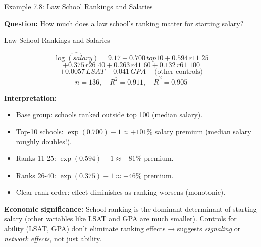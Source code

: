 \documentclass[aspectratio=169, 12pt]{beamer}
\begin{document}
\begin{frame}[shrink=28]{Example 7.8: Law School Rankings and Salaries}

  \textbf{Question:} How much does a law school's ranking matter for starting salary?

  \medskip

  \begin{examplebox}{Law School Rankings and Salaries}
    \begin{small}
    \[
      \widehat{\log(\textit{salary})} = 9.17 + 0.700 \, \textit{top10} + 0.594 \, \textit{r11\_25}
    \]
    \[
      + 0.375 \, \textit{r26\_40} + 0.263 \, \textit{r41\_60} + 0.132 \, \textit{r61\_100}
    \]
    \[
      + 0.0057 \, \textit{LSAT} + 0.041 \, \textit{GPA} + \text{(other controls)}
    \]
    \[
      n = 136, \quad R^2 = 0.911, \quad \bar{R}^2 = 0.905
    \]
    \end{small}
  \end{examplebox}

  \medskip

  \textbf{Interpretation:}

  \begin{keybox}
    \begin{itemize}
      \item Base group: schools ranked outside top 100 (median salary).
      \item Top-10 schools: $\exp(0.700) - 1 \approx +101\%$ salary premium (median salary roughly doubles!).
      \item Ranks 11-25: $\exp(0.594) - 1 \approx +81\%$ premium.
      \item Ranks 26-40: $\exp(0.375) - 1 \approx +46\%$ premium.
      \item Clear rank order: effect diminishes as ranking worsens (monotonic).
    \end{itemize}
  \end{keybox}

  \medskip

  \begin{highlightbox}
    \textbf{Economic significance:} School ranking is the dominant determinant of starting salary (other variables like LSAT and GPA are much smaller). Controls for ability (LSAT, GPA) don't eliminate ranking effects → suggests \textit{signaling} or \textit{network effects}, not just ability.
  \end{highlightbox}

\end{frame}
\end{document}
